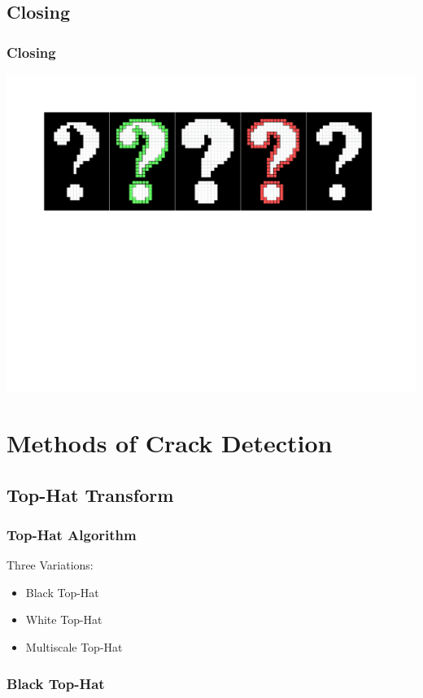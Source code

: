 \documentclass{beamer}
\begin{document}
\subsection[Closing]{Closing}

\begin{frame}
\frametitle{Closing}
\includegraphics[width=1\textwidth]{closing}
\end{frame}

\section[Methods of Crack Detection]{Methods of Crack Detection}

\subsection[Top-Hat Transform]{Top-Hat Transform}

\begin{frame}
\frametitle{Top-Hat Algorithm}
Three Variations:
\begin{itemize}
\item Black Top-Hat
\linebreak
\item White Top-Hat
\linebreak
\item Multiscale Top-Hat
\end{itemize}
\end{frame}

\subsubsection[Black Top-Hat]{Black Top-Hat}
\end{document}
